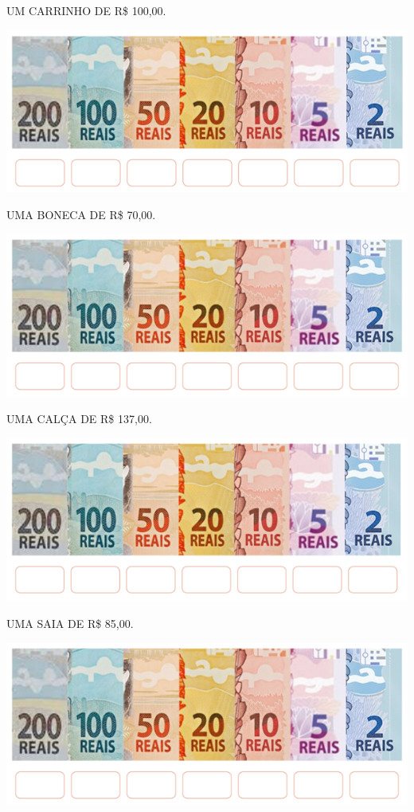 \begin{escolha}
\item UM CARRINHO DE R\$ 100,00.

\includegraphics[width=.75\textwidth]{./media/SAEB_1ANO_MAT_FIGURA71.png}


\item UMA BONECA DE R\$ 70,00.

\includegraphics[width=.75\textwidth]{./media/SAEB_1ANO_MAT_FIGURA72.png}


\item UMA CALÇA DE R\$ 137,00.

\includegraphics[width=.75\textwidth]{./media/SAEB_1ANO_MAT_FIGURA73.png}


\item UMA SAIA DE R\$ 85,00.

\includegraphics[width=.75\textwidth]{./media/SAEB_1ANO_MAT_FIGURA74.png}


\end{escolha}
